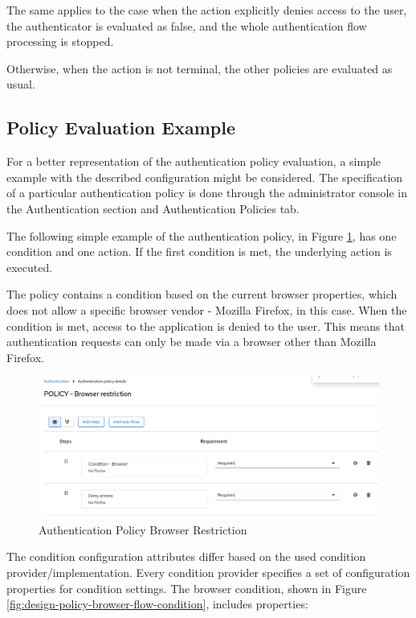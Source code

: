 The same applies to the case when the action explicitly denies access to the user, the authenticator is evaluated as false, and the whole authentication flow processing is stopped.

Otherwise, when the action is not terminal, the other policies are evaluated as usual.

\newpage

\subsection{Policy Evaluation Example}
For a better representation of the authentication policy evaluation, a simple example with the described configuration might be considered.
The specification of a particular authentication policy is done through the administrator console in the Authentication section and Authentication Policies tab.

The following simple example of the authentication policy, in Figure \ref{fig:design-policy-browser-flow}, has one condition and one action.
If the first condition is met, the underlying action is executed.

The policy contains a condition based on the current browser properties, which does not allow a specific browser vendor - Mozilla Firefox, in this case.
When the condition is met, access to the application is denied to the user.
This means that authentication requests can only be made via a browser other than Mozilla Firefox.

\begin{figure}[htbp]
  \centering
  \includegraphics[width=1\textwidth]{img/sections/5-design/policy-browser-flow.png}
  \caption{Authentication Policy Browser Restriction}
  \label{fig:design-policy-browser-flow}
\end{figure}

\newpage

The condition configuration attributes differ based on the used condition provider/implementation.
Every condition provider specifies a set of configuration properties for condition settings.
\newline
\newline
The browser condition, shown in Figure \ref{fig:design-policy-browser-flow-condition}, includes properties:

